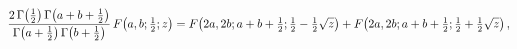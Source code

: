 \[\frac{2\mathop{\Gamma\/}\nolimits\!\left(\tfrac{1}{2}\right)\mathop{\Gamma\/}%
\nolimits\!\left(a+b+\tfrac{1}{2}\right)}{\mathop{\Gamma\/}\nolimits\!\left(a+%
\tfrac{1}{2}\right)\mathop{\Gamma\/}\nolimits\!\left(b+\tfrac{1}{2}\right)}%
\mathop{F\/}\nolimits\!\left(a,b;\tfrac{1}{2};z\right)=\mathop{F\/}\nolimits\!%
\left(2a,2b;a+b+\tfrac{1}{2};\tfrac{1}{2}-\tfrac{1}{2}\sqrt{z}\right)+\mathop{%
F\/}\nolimits\!\left(2a,2b;a+b+\tfrac{1}{2};\tfrac{1}{2}+\tfrac{1}{2}\sqrt{z}%
\right),\]